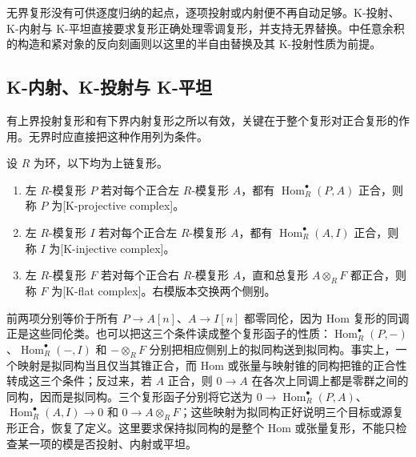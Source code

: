 

无界复形没有可供逐度归纳的起点，逐项投射或内射便不再自动足够。K-投射、K-内射与 K-平坦直接要求复形正确处理零调复形，并支持无界替换。中任意余积的构造和紧对象的反向刻画则以这里的半自由替换及其 K-投射性质为前提。

%
%
%

\subsection{K-内射、K-投射与 K-平坦}
\label{b4:subsec:1804:01}

有上界投射复形和有下界内射复形之所以有效，关键在于整个复形对正合复形的作用。无界时应直接把这种作用列为条件。

\begin{definition}\label{b4:def:k-resolutions}
	设 \(R\) 为环，以下均为上链复形。
	\begin{enumerate}
		\item 左 \(R\)-模复形 \(P\) 若对每个正合左 \(R\)-模复形 \(A\)，都有 \(\operatorname{Hom}_R^\bullet(P,A)\) 正合，则称 \(P\) 为[K-projective complex]。
		\item 左 \(R\)-模复形 \(I\) 若对每个正合左 \(R\)-模复形 \(A\)，都有 \(\operatorname{Hom}_R^\bullet(A,I)\) 正合，则称 \(I\) 为[K-injective complex]。
		\item 左 \(R\)-模复形 \(F\) 若对每个正合右 \(R\)-模复形 \(A\)，直和总复形 \(A\otimes_RF\) 都正合，则称 \(F\) 为[K-flat complex]。右模版本交换两个侧别。
	\end{enumerate}
\end{definition}

前两项分别等价于所有 \(P\to A[n]\)、\(A\to I[n]\) 都零同伦，因为 Hom 复形的同调正是这些同伦类。也可以把这三个条件读成整个复形函子的性质：\(\operatorname{Hom}_R^\bullet(P,-)\)、\(\operatorname{Hom}_R^\bullet(-,I)\) 和 \(-\otimes_RF\) 分别把相应侧别上的拟同构送到拟同构。事实上，一个映射是拟同构当且仅当其锥正合，而 Hom 或张量与映射锥的同构把锥的正合性转成这三个条件；反过来，若 \(A\) 正合，则 \(0\to A\) 在各次上同调上都是零群之间的同构，因而是拟同构。三个复形函子分别将它送为 \(0\to\operatorname{Hom}_R^\bullet(P,A)\)、\(\operatorname{Hom}_R^\bullet(A,I)\to0\) 和 \(0\to A\otimes_RF\)；这些映射为拟同构正好说明三个目标或源复形正合，恢复了定义。这里要求保持拟同构的是整个 Hom 或张量复形，不能只检查某一项的模是否投射、内射或平坦。

